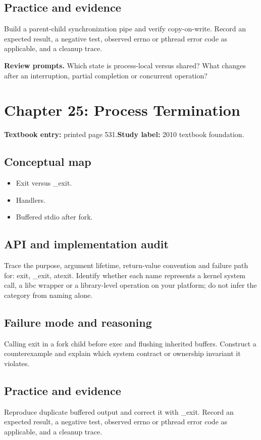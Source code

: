 \documentclass[11pt,letterpaper,oneside]{report}
\begin{document}
\subsection{Practice and evidence}
Build a parent-child synchronization pipe and verify copy-on-write. Record an expected result, a negative test, observed errno or pthread error code as applicable, and a cleanup trace.

\textbf{Review prompts.} Which state is process-local versus shared? What changes after an interruption, partial completion or concurrent operation?

\section{Chapter 25: Process Termination}
\textbf{Textbook entry:} printed page 531.\quad \textbf{Study label:} 2010 textbook foundation.

\subsection{Conceptual map}
\begin{itemize}
\item Exit versus \_exit.
\item Handlers.
\item Buffered stdio after fork.
\end{itemize}
\subsection{API and implementation audit}
Trace the purpose, argument lifetime, return-value convention and failure path for: exit, \_exit, atexit. Identify whether each name represents a kernel system call, a libc wrapper or a library-level operation on your platform; do not infer the category from naming alone.

\subsection{Failure mode and reasoning}
Calling exit in a fork child before exec and flushing inherited buffers. Construct a counterexample and explain which system contract or ownership invariant it violates.

\subsection{Practice and evidence}
Reproduce duplicate buffered output and correct it with \_exit. Record an expected result, a negative test, observed errno or pthread error code as applicable, and a cleanup trace.
\end{document}
